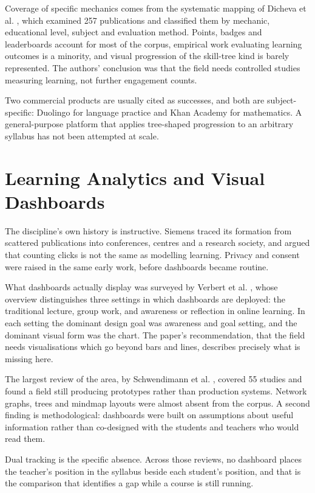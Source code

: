 Coverage of specific mechanics comes from the systematic mapping of Dicheva et al. \cite{dicheva2015gamification}, which examined 257 publications and classified them by mechanic, educational level, subject and evaluation method. Points, badges and leaderboards account for most of the corpus, empirical work evaluating learning outcomes is a minority, and visual progression of the skill-tree kind is barely represented. The authors' conclusion was that the field needs controlled studies measuring learning, not further engagement counts.

Two commercial products are usually cited as successes, and both are subject-specific: Duolingo for language practice and Khan Academy for mathematics. A general-purpose platform that applies tree-shaped progression to an arbitrary syllabus has not been attempted at scale.

\section{Learning Analytics and Visual Dashboards}

The discipline's own history is instructive. Siemens \cite{siemens2013learning} traced its formation from scattered publications into conferences, centres and a research society, and argued that counting clicks is not the same as modelling learning. Privacy and consent were raised in the same early work, before dashboards became routine.

What dashboards actually display was surveyed by Verbert et al. \cite{verbert2014learning}, whose overview distinguishes three settings in which dashboards are deployed: the traditional lecture, group work, and awareness or reflection in online learning. In each setting the dominant design goal was awareness and goal setting, and the dominant visual form was the chart. The paper's recommendation, that the field needs visualisations which go beyond bars and lines, describes precisely what is missing here.

The largest review of the area, by Schwendimann et al. \cite{schwendimann2017perceiving}, covered 55 studies and found a field still producing prototypes rather than production systems. Network graphs, trees and mindmap layouts were almost absent from the corpus. A second finding is methodological: dashboards were built on assumptions about useful information rather than co-designed with the students and teachers who would read them.

Dual tracking is the specific absence. Across those reviews, no dashboard places the teacher's position in the syllabus beside each student's position, and that is the comparison that identifies a gap while a course is still running.

